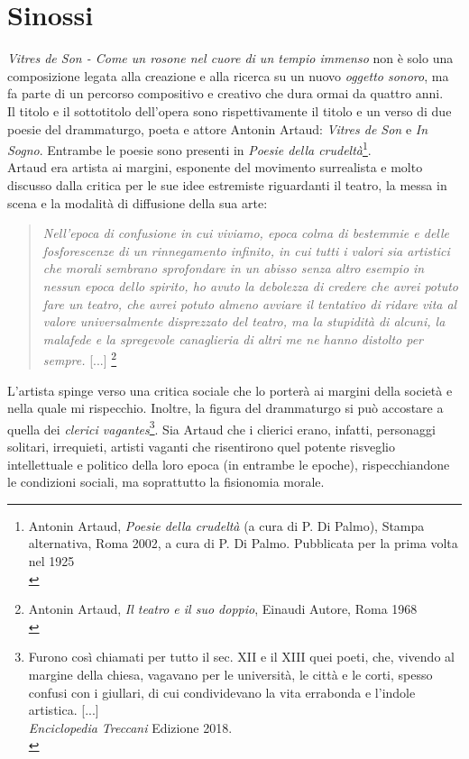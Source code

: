 
\chapter{Sinossi}
\label{chp:Sinossi}

\textit{Vitres de Son - Come un rosone nel cuore di un tempio immenso} non è solo una composizione legata alla creazione e alla ricerca su un nuovo \textit{oggetto sonoro}, ma fa parte di un percorso compositivo e creativo che dura ormai da quattro anni. \\
Il titolo e il sottotitolo dell'opera sono rispettivamente il titolo e un verso di due poesie del drammaturgo, poeta e attore Antonin Artaud: \textit{Vitres de Son} e \textit{In Sogno}. Entrambe le poesie sono presenti in \textit{Poesie della crudeltà}\footnote{Antonin Artaud, \textit{Poesie della crudeltà} (a cura di P. Di Palmo), Stampa alternativa, Roma 2002, a cura di P. Di Palmo. Pubblicata per la prima volta nel 1925 \\}. \\
Artaud era artista ai margini, esponente del movimento surrealista e molto discusso dalla critica per le sue idee estremiste riguardanti il teatro, la messa in scena  e la modalità di diffusione della sua arte:
\begin{small}
\begin{quotation}
\textit{Nell'epoca di confusione in cui viviamo, epoca colma di bestemmie e delle fosforescenze di un rinnegamento infinito, in cui tutti i valori sia artistici che morali sembrano sprofondare in un abisso senza altro esempio in nessun epoca dello spirito, ho avuto la debolezza di credere che avrei potuto fare un teatro, che avrei potuto almeno avviare il tentativo di ridare vita al valore universalmente disprezzato del teatro, ma la stupidità di alcuni, la malafede e la spregevole canaglieria di altri me ne hanno distolto per sempre. } [...] \footnote{Antonin Artaud, \textit{Il teatro e il suo doppio}, Einaudi Autore, Roma 1968 \\}
\end{quotation}
\end{small}
L'artista spinge verso una critica sociale che lo porterà ai margini della società e nella quale mi rispecchio. Inoltre, la figura del drammaturgo si può accostare a quella dei \textit{clerici vagantes}\footnote{Furono così chiamati per tutto il sec. XII e il XIII quei poeti, che, vivendo al margine della chiesa, vagavano per le università, le città e le corti, spesso confusi con i giullari, di cui condividevano la vita errabonda e l'indole artistica. [...] \\ \textit{Enciclopedia Treccani} Edizione 2018. \\}. Sia Artaud che i clierici erano, infatti, personaggi solitari, irrequieti, artisti vaganti che risentirono quel potente risveglio intellettuale e politico della loro epoca (in entrambe le epoche), rispecchiandone le condizioni sociali, ma soprattutto la fisionomia morale. \\
